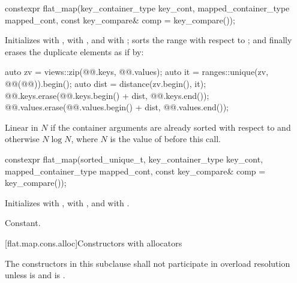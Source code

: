 %
\begin{itemdecl}
constexpr flat_map(key_container_type key_cont, mapped_container_type mapped_cont,
                   const key_compare& comp = key_compare());
\end{itemdecl}

\begin{itemdescr}
\pnum
\effects
Initializes
 with ,
 with , and
 with ;
sorts the range  with respect to ; and
finally erases the duplicate elements as if by:
\begin{codeblock}
auto zv = views::zip(@@.keys, @@.values);
auto it = ranges::unique(zv, @@(@@)).begin();
auto dist = distance(zv.begin(), it);
@@.keys.erase(@@.keys.begin() + dist, @@.keys.end());
@@.values.erase(@@.values.begin() + dist, @@.values.end());
\end{codeblock}

\pnum
\complexity
Linear in $N$ if the container arguments are already sorted
with respect to  and otherwise $N \log N$,
where $N$ is the value of  before this call.
\end{itemdescr}

%
\begin{itemdecl}
constexpr flat_map(sorted_unique_t, key_container_type key_cont, mapped_container_type mapped_cont,
                   const key_compare& comp = key_compare());
\end{itemdecl}

\begin{itemdescr}
\pnum
\effects
Initializes
 with ,
 with , and
 with .

\pnum
\complexity
Constant.
\end{itemdescr}

[flat.map.cons.alloc]{Constructors with allocators}

\pnum
The constructors in this subclause shall not participate in overload resolution
unless  is 
and  is .

